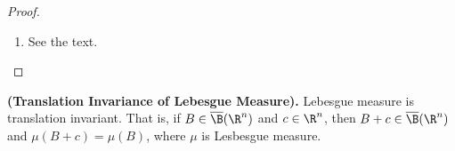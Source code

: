 \documentclass{article} %
\newenvironment{alphabate}
    {\begin{enumerate}[label=\alph*)]}
	{\end{enumerate} }
\begin{document}
\begin{proof}
\begin{alphabate}
We have 
\begin{align*}
\mu(B) & \stackrel{1}{\leq}	\inf \set{\mu(V) : V \supset B, V \text{ open}} && \tinytext{by monotonicity and Definition \ref{def:supremum_and_infimum}} \\
 & \stackrel{2}{\leq}	\inf \set{\mu(K^c) : K^c \supset B, K \text{ compact}} && \tinytext{by monotonicity and Proposition \ref{prop:sup_and_inf_for_subsets_are_tighter}} \\
 &= \inf \set{\mu(\R^n) - \mu(K) : K \subset B^c, K \text{ compact}} && \tinytext{by piece-and-difference, $\mu$ finite} \\
 & \stackrel{3}{=}	\mu(\R^n) - \sup \set{\mu(K) : K \subset B^c, K \text{ compact}} && \tinytext{by Proposition \ref{prop:sup_and_inf_for_minkowski_sum_and_diff}} \\
  & =	\mu(\R^n) - \mu(B^c)  && \tinytext{by part (a)}\\
&= \mu(B)
\end{align*}
For more details, Equation (1) holds since, by monotonicity, the LHS is a lower bound on the RHS, so the statement must be true by definition of infimum. Equation (2) holds since the LHS is a smaller set than the RHS (because not every open set is the complement of a compact set)\footnote{Recall that in $\R^n$, a compact set is both closed \textit{and} bounded.}, and the infimum can only increase on subsets by Proposition \ref{prop:sup_and_inf_for_subsets_are_tighter}. Equation (3) holds by writing $\mu(K^c) = \mu(\R^n) - \mu(K)$.  This has the form of a Minkowski set difference $A = \set{c} - B$, where $c$ is a singleton.  So we have $\inf A = \inf ( \set{c} - B) \stackrel{Prop. \ref{prop:sup_and_inf_for_minkowski_sum_and_diff}}{=} \inf \set{c} - \sup B = c - \sup B$. 
\item See the text.
\end{alphabate}
 
 \end{proof}


\begin{proposition}
\textbf{(Translation Invariance of Lebesgue Measure).} Lebesgue measure is translation invariant.  That is, if $B \in \overline{\B}(\R^n)$ and $c \in \R^n$, then $B+c \in  \overline{\B}(\R^n)$ and $\mu(B+c)=\mu(B)$, where $\mu$ is Lesbesgue measure.	
\label{prop:lesbesgue_measure_is_translation_invariant}
\end{proposition}
\end{document}
